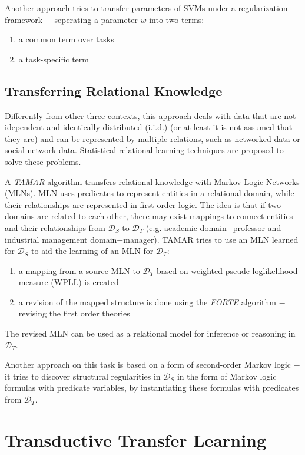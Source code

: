\documentclass[a4paper,twocolumn]{article}
\newcommand{\D}{\mathcal{D}}
\begin{document}
Another approach tries to transfer parameters of SVMs under a regularization framework $-$ seperating a parameter $w$ into two terms:
\begin{enumerate}
    \item a common term over tasks
    \item a task-specific term
\end{enumerate}

\subsection{Transferring Relational Knowledge}
Differently from other three contexts, this approach deals with data that are not idependent and identically distributed (i.i.d.) (or at least it is not assumed that they are) and can be represented by multiple relations, such as networked data or social network data. Statistical relational learning techniques are proposed to solve these problems.

A \textit{TAMAR} algorithm transfers relational knowledge with Markov Logic Networks (MLNs). MLN uses predicates to represent entities in a relational domain, while their relationships are represented in first-order logic. The idea is that if two domains are related to each other, there may exist mappings to connect entities and their relationships from $\D_S$ to $\D_T$ (e.g. academic domain$-$professor and industrial management domain$-$manager). TAMAR tries to use an MLN learned for $\D_S$ to aid the learning of an MLN for $\D_T$:
\begin{enumerate}
    \item a mapping from a source MLN to $\D_T$ based on weighted pseude loglikelihood measure (WPLL) is created
    \item a revision of the mapped structure is done using the \textit{FORTE} algorithm $-$ revising the first order theories
\end{enumerate}
The revised MLN can be used as a relational model for inference or reasoning in $\D_T$.

Another approach on this task is based on a form of second-order Markov logic $-$ it tries to discover structural regularities in $\D_S$ in the form of Markov logic formulas with predicate variables, by instantiating these formulas with predicates from $\D_T$.

\section{Transductive Transfer Learning}
\end{document}
